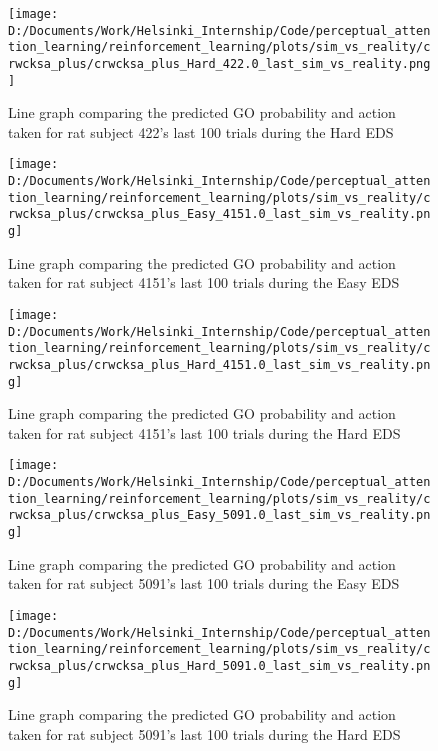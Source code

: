 \documentclass[12pt]{article}
\newcommand{\scaletwo}{0.35}
\begin{document}
\begin{figure}[h]  %
	\centering
	\texttt{[image: D:/Documents/Work/Helsinki\_Internship/Code/perceptual\_attention\_learning/reinforcement\_learning/plots/sim\_vs\_reality/crwcksa\_plus/crwcksa\_plus\_Hard\_422.0\_last\_sim\_vs\_reality.png]}  %
	\caption{Line graph comparing the predicted GO probability and action taken for rat subject 422's last 100 trials during the Hard EDS}
	\label{fig:422_hard}
\end{figure} 

\begin{figure}[h]  %
	\centering
	\texttt{[image: D:/Documents/Work/Helsinki\_Internship/Code/perceptual\_attention\_learning/reinforcement\_learning/plots/sim\_vs\_reality/crwcksa\_plus/crwcksa\_plus\_Easy\_4151.0\_last\_sim\_vs\_reality.png]}  %
	\caption{Line graph comparing the predicted GO probability and action taken for rat subject 4151's last 100 trials during the Easy EDS}
	\label{fig:4151_easy}
\end{figure} 

\begin{figure}[h]  %
	\centering
	\texttt{[image: D:/Documents/Work/Helsinki\_Internship/Code/perceptual\_attention\_learning/reinforcement\_learning/plots/sim\_vs\_reality/crwcksa\_plus/crwcksa\_plus\_Hard\_4151.0\_last\_sim\_vs\_reality.png]}  %
	\caption{Line graph comparing the predicted GO probability and action taken for rat subject 4151's last 100 trials during the Hard EDS}
	\label{fig:4151_hard}
\end{figure} 
\begin{figure}[h]  %
	\centering
	\texttt{[image: D:/Documents/Work/Helsinki\_Internship/Code/perceptual\_attention\_learning/reinforcement\_learning/plots/sim\_vs\_reality/crwcksa\_plus/crwcksa\_plus\_Easy\_5091.0\_last\_sim\_vs\_reality.png]}  %
	\caption{Line graph comparing the predicted GO probability and action taken for rat subject 5091's last 100 trials during the Easy EDS}
	\label{fig:5091_easy}
\end{figure} 

\begin{figure}[h]  %
	\centering
	\texttt{[image: D:/Documents/Work/Helsinki\_Internship/Code/perceptual\_attention\_learning/reinforcement\_learning/plots/sim\_vs\_reality/crwcksa\_plus/crwcksa\_plus\_Hard\_5091.0\_last\_sim\_vs\_reality.png]}  %
	\caption{Line graph comparing the predicted GO probability and action taken for rat subject 5091's last 100 trials during the Hard EDS}
	\label{fig:5091_hard}
\end{figure} 
\clearpage
\end{document}
